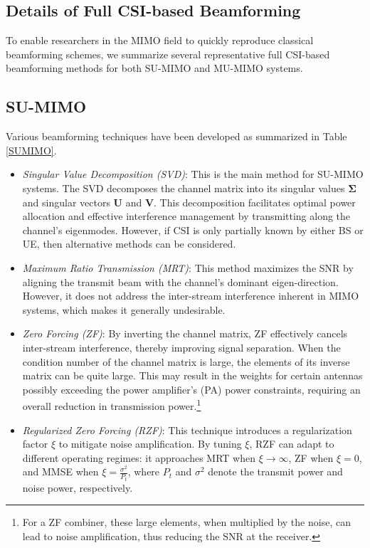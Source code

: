 \documentclass[lettersize,journal]{IEEEtran}
\begin{document}
\begin{appendices}    
\section{Details of Full CSI-based Beamforming}\label{appdA}
To enable researchers in the MIMO field to quickly reproduce classical beamforming schemes, we summarize several representative full CSI-based beamforming methods for both SU-MIMO and MU-MIMO systems.
\subsection{SU-MIMO}\label{BF-SU-MIMO}


Various beamforming techniques have been developed as summarized in Table \ref{SUMIMO}.

\begin{itemize}
    \item \emph{Singular Value Decomposition (SVD)}: This is the main method for SU-MIMO systems. The SVD decomposes the channel matrix into its singular values $\bm{\Sigma}$ and singular vectors $\mathbf{U}$ and $\mathbf{V}$. This decomposition facilitates optimal power allocation and effective interference management by transmitting along the channel’s eigenmodes. However, if CSI is only partially known by either BS or UE, then alternative methods can be considered.
    \item \emph{Maximum Ratio Transmission (MRT)}: This method maximizes the SNR by aligning the transmit beam with the channel’s dominant eigen-direction. However, it does not address the inter-stream interference inherent in MIMO systems, which makes it generally undesirable.
    \item \emph{Zero Forcing (ZF)}: By inverting the channel matrix, ZF effectively cancels inter-stream interference, thereby improving signal separation. When the condition number of the channel matrix is large, the elements of its inverse matrix can be quite large. This may result in the weights for certain antennas possibly exceeding the power amplifier's (PA) power constraints, requiring an overall reduction in transmission power.\footnote{For a ZF combiner, these large elements, when multiplied by the noise, can lead to noise amplification, thus reducing the SNR at the receiver.}
    \item \emph{Regularized Zero Forcing (RZF)}: This technique introduces a regularization factor $\xi$ to mitigate noise amplification. By tuning $\xi$, RZF can adapt to different operating regimes: it approaches MRT when $\xi\rightarrow\infty$, ZF when $\xi=0$, and MMSE when $\xi=\frac{\sigma^2}{P_t}$, where $P_t$ and $\sigma^2$ denote the transmit power and noise power, respectively.

\end{itemize}
\end{appendices}
\end{document}
